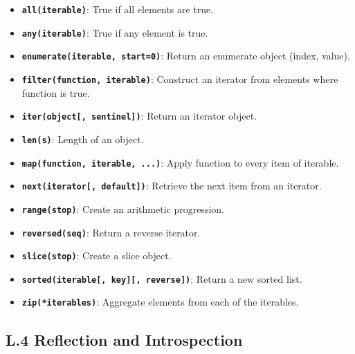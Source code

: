 \begin{itemize}
\tightlist
\item
  \textbf{\passthrough{\lstinline!all(iterable)!}}: True if all elements
  are true.
\item
  \textbf{\passthrough{\lstinline!any(iterable)!}}: True if any element
  is true.
\item
  \textbf{\passthrough{\lstinline!enumerate(iterable, start=0)!}}:
  Return an enumerate object (index, value).
\item
  \textbf{\passthrough{\lstinline!filter(function, iterable)!}}:
  Construct an iterator from elements where function is true.
\item
  \textbf{\passthrough{\lstinline!iter(object[, sentinel])!}}: Return an
  iterator object.
\item
  \textbf{\passthrough{\lstinline!len(s)!}}: Length of an object.
\item
  \textbf{\passthrough{\lstinline!map(function, iterable, ...)!}}: Apply
  function to every item of iterable.
\item
  \textbf{\passthrough{\lstinline!next(iterator[, default])!}}: Retrieve
  the next item from an iterator.
\item
  \textbf{\passthrough{\lstinline!range(stop)!}}: Create an arithmetic
  progression.
\item
  \textbf{\passthrough{\lstinline!reversed(seq)!}}: Return a reverse
  iterator.
\item
  \textbf{\passthrough{\lstinline!slice(stop)!}}: Create a slice object.
\item
  \textbf{\passthrough{\lstinline!sorted(iterable[, key][, reverse])!}}:
  Return a new sorted list.
\item
  \textbf{\passthrough{\lstinline!zip(*iterables)!}}: Aggregate elements
  from each of the iterables.
\end{itemize}

\hypertarget{l.4-reflection-and-introspection}{%
\subsection{L.4 Reflection and
Introspection}\label{l.4-reflection-and-introspection}}

